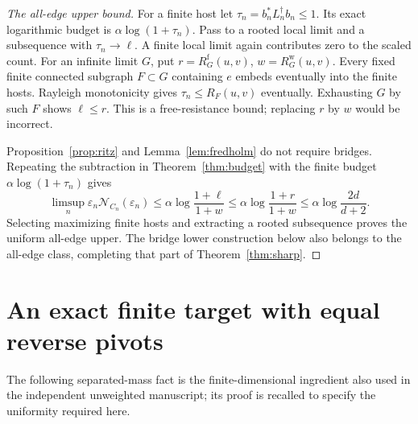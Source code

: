 \documentclass[11pt]{article}
\newcommand{\N}{\mathcal N}
\begin{document}
\begin{proof}[The all-edge upper bound]
For a finite host let $\tau_n=b_n^*L_n^\dagger b_n\le1$. Its exact
logarithmic budget is $\alpha\log(1+\tau_n)$. Pass to a rooted local
limit and a subsequence with $\tau_n\to\ell$. A finite local limit
again contributes zero to the scaled count. For an infinite limit $G$,
put $r=R_G^{\mathrm f}(u,v)$, $w=R_G^{\mathrm w}(u,v)$.
Every fixed finite connected subgraph $F\subset G$ containing $e$
embeds eventually into the finite hosts. Rayleigh monotonicity gives
$\tau_n\le R_F(u,v)$ eventually. Exhausting $G$ by such $F$ shows
$\ell\le r$. This is a free-resistance bound; replacing $r$ by $w$
would be incorrect.

Proposition~\ref{prop:ritz} and Lemma~\ref{lem:fredholm} do not require
bridges. Repeating the subtraction in Theorem~\ref{thm:budget} with the
finite budget $\alpha\log(1+\tau_n)$ gives
\[
 \limsup_n\varepsilon_n\N_{C_n}(\varepsilon_n)
 \le\alpha\log\frac{1+\ell}{1+w}
 \le\alpha\log\frac{1+r}{1+w}
 \le\alpha\log\frac{2d}{d+2}.
\]
Selecting maximizing finite hosts and extracting a rooted subsequence
proves the uniform all-edge upper. The bridge lower construction below
also belongs to the all-edge class, completing that part of
Theorem~\ref{thm:sharp}.
\end{proof}

\section{An exact finite target with equal reverse pivots}
The following separated-mass fact is the finite-dimensional ingredient
also used in the independent unweighted manuscript; its proof is
recalled to specify the uniformity required here.
\end{document}
